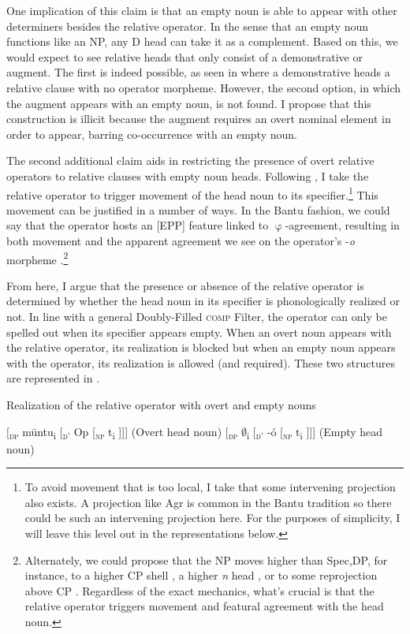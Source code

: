 \documentclass[output=paper,colorlinks,citecolor=brown
]{langscibook}
\begin{document}
One implication of this claim is that an empty noun is able to appear with other determiners besides the relative operator. In the sense that an empty noun functions like an NP, any D head can take it as a complement. Based on this, we would expect to see relative heads that only consist of a demonstrative or augment. The first is indeed possible, as seen in  where a demonstrative heads a relative clause with no operator morpheme. However, the second option, in which the augment appears with an empty noun, is not found. I propose that this construction is illicit because the augment requires an overt nominal element in order to appear, barring co-occurrence with an empty noun.

The second additional claim aids in restricting the presence of overt relative operators to relative clauses with empty noun heads. Following \citet{Jenksetal:2017}, I take the relative operator to trigger movement of the head noun to its specifier.\footnote{To avoid movement that is too local, I take that some intervening projection also exists. A projection like Agr is common in the Bantu tradition so there could be such an intervening projection here. For the purposes of simplicity, I will leave this level out in the representations below.} This movement can be justified in a number of ways. In the Bantu fashion, we could say that the operator hosts an [EPP] feature linked to $\upvarphi$-agreement, resulting in both movement and the apparent agreement we see on the operator's -\emph{o} morpheme \citep{Carstens:2005}.\footnote{Alternately, we could propose that the NP moves higher than Spec,DP, for instance, to a higher CP shell \citep{Zwart:2000}, a higher \emph{n} head \citep{deVries:2002}, or to some reprojection above CP \citep{Bhatt:2002}. Regardless of the exact mechanics, what's crucial is that the relative operator triggers movement and featural agreement with the head noun.}

From here, I argue that the presence or absence of the relative operator is determined by whether the head noun in its specifier is phonologically realized or not. In line with a general Doubly-Filled \textsc{comp} Filter, the operator can only be spelled out when its specifier appears empty. When an overt noun appears with the relative operator, its realization is blocked but when an empty noun appears with the operator, its realization is allowed (and required). These two structures are represented in .


\ea Realization of the relative operator with overt and empty nouns \label{ex:myers:empty}
 \begin{xlist}
 \ex  $[$\textsubscript{\textsc{dp}} mūntu\textsubscript{i} [\textsubscript{\textsc{d'}} Op [\textsubscript{\textsc{np}} t\textsubscript{i} ]]] \hfill{(Overt head noun)}
\ex  $[$\textsubscript{\textsc{dp}} $\emptyset$\textsubscript{i} [\textsubscript{\textsc{d'}} -ó [\textsubscript{\textsc{np}} t\textsubscript{i} ]]] \hfill{(Empty head noun)}
\end{xlist} 
\z
\end{document}
